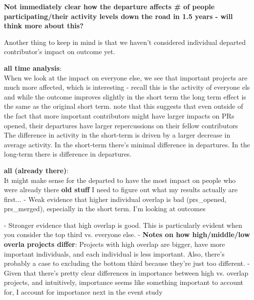 \textbf{Not immediately clear how the departure affects # of people participating/their activity levels down the road in 1.5 years - will think more about this?}

Another thing to keep in mind is that we haven't considered individual departed contributor's impact on outcome yet. 

\textbf{all time analysis}: \\
When we look at the impact on everyone else, we see that important projects are much more affected, which is interesting - recall this is the activity of everyone els and while the outcome improves slightly in the short term the long term effect is the same as the original short term. 
note that this suggests that even outside of the fact that more important contributors might have larger impacts on PRs opened, their departures have larger repercussions on their fellow contributors
The difference in activity in the short-term is driven by a larger decrease in average activity. In the short-term there's minimal difference in departures. In the long-term there is difference in departures. 


\textbf{all (already there)}: \\
It might make sense for the departed to have the most impact on people who were already there
\iffalse
\textbf{old stuff}
I need to figure out what my results actually are first...
- Weak evidence that higher individual overlap is bad (prs_opened, prs_merged), especially in the short term. I'm looking at outcomes

- Stronger evidence that high overlap is good. This is particularly evident when you consider the top third vs. everyone else. 
  - \textbf{Notes on how high/middle/low overla projects differ}: Projects with high overlap are bigger, have more important individuals, and each individual is less important. Also, there's probably a case to excluding the bottom third because they're just too different. 
- Given that there's pretty clear differences in importance between high vs. overlap projects, and intuitively, importance seems like something important to account for, I account for importance next in the event study

